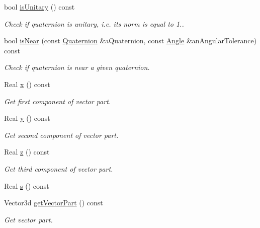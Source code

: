 \begin{DoxyCompactItemize}
bool \hyperlink{classlibrary_1_1math_1_1geom_1_1trf_1_1rot_1_1_quaternion_aa5e8e0dc04aa0ac976106c823b61d911}{is\+Unitary} () const
\begin{DoxyCompactList}\small\item\em Check if quaternion is unitary, i.\+e. its norm is equal to 1.. \end{DoxyCompactList}\item 
bool \hyperlink{classlibrary_1_1math_1_1geom_1_1trf_1_1rot_1_1_quaternion_ac445a1089b34c5650ce47f2f8873d7b1}{is\+Near} (const \hyperlink{classlibrary_1_1math_1_1geom_1_1trf_1_1rot_1_1_quaternion}{Quaternion} \&a\+Quaternion, const \hyperlink{classlibrary_1_1math_1_1geom_1_1_angle}{Angle} \&an\+Angular\+Tolerance) const
\begin{DoxyCompactList}\small\item\em Check if quaternion is near a given quaternion. \end{DoxyCompactList}\item 
Real \hyperlink{classlibrary_1_1math_1_1geom_1_1trf_1_1rot_1_1_quaternion_abd664a9792b2e039a980e77b861f74dd}{x} () const
\begin{DoxyCompactList}\small\item\em Get first component of vector part. \end{DoxyCompactList}\item 
Real \hyperlink{classlibrary_1_1math_1_1geom_1_1trf_1_1rot_1_1_quaternion_a5bbbf13da75dd8b89fb1a18326f8d2d1}{y} () const
\begin{DoxyCompactList}\small\item\em Get second component of vector part. \end{DoxyCompactList}\item 
Real \hyperlink{classlibrary_1_1math_1_1geom_1_1trf_1_1rot_1_1_quaternion_aaf9021e33aad157bf1444485fb486513}{z} () const
\begin{DoxyCompactList}\small\item\em Get third component of vector part. \end{DoxyCompactList}\item 
Real \hyperlink{classlibrary_1_1math_1_1geom_1_1trf_1_1rot_1_1_quaternion_a7b5045b46500d4f20e98ff29a9ed4c88}{s} () const
\item 
Vector3d \hyperlink{classlibrary_1_1math_1_1geom_1_1trf_1_1rot_1_1_quaternion_a3f51bfc8976d79f8d4efb7d32d5a422b}{get\+Vector\+Part} () const
\begin{DoxyCompactList}\small\item\em Get vector part. \end{DoxyCompactList}\item 

\end{DoxyCompactItemize}
